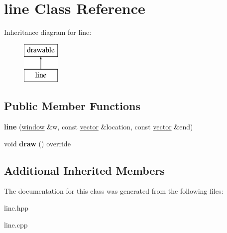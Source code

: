 \hypertarget{classline}{}\section{line Class Reference}
\label{classline}
Inheritance diagram for line\+:\begin{figure}[H]
\begin{center}
\leavevmode
\includegraphics[height=2.000000cm]{classline}
\end{center}
\end{figure}
\subsection*{Public Member Functions}
\begin{DoxyCompactItemize}
\item 
\mbox{\label{classline_a43ea2acfb458b795c9958508dadd9d18}} 
{\bfseries line} (\hyperlink{classwindow}{window} \&w, const \hyperlink{classvector}{vector} \&location, const \hyperlink{classvector}{vector} \&end)
\item 
\mbox{\label{classline_af667c8ab35370df5d90e595cfb647c72}} 
void {\bfseries draw} () override
\end{DoxyCompactItemize}
\subsection*{Additional Inherited Members}


The documentation for this class was generated from the following files\+:\begin{DoxyCompactItemize}
\item 
line.\+hpp\item 
line.\+cpp\end{DoxyCompactItemize}
